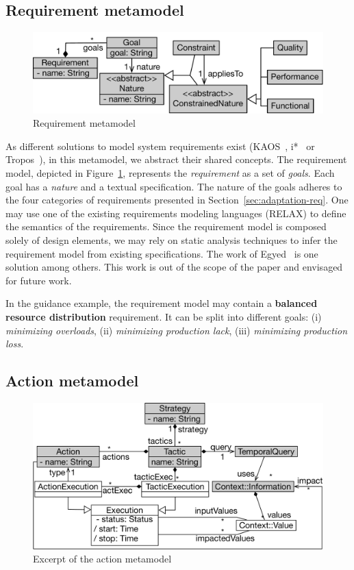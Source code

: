 \subsection{Requirement metamodel}

\begin{figure}
	\centering
	\includegraphics[width=0.7\linewidth]{img/chapt-tkm/mm/requirementModel}
	\caption{Requirement metamodel}
	\label{fig:requirement-model}
\end{figure}

As different solutions to model system requirements exist (\eg KAOS~\cite{DBLP:journals/scp/DardenneLF93}, i*~\cite{yu2011modelling} or Tropos~\cite{DBLP:journals/aamas/BrescianiPGGM04}), in this metamodel, we abstract their shared concepts.
The requirement model, depicted in Figure~\ref{fig:requirement-model}, represents the \textit{requirement} as a set of \textit{goals}.
Each goal has a \textit{nature} and a textual specification.
The nature of the goals adheres to the four categories of requirements presented in Section~\ref{sec:adaptation-req}.
One may use one of the existing requirements modeling languages (\eg RELAX) to define the semantics of the requirements. 
Since the requirement model is composed solely of design elements, we may rely on static analysis techniques to infer the requirement model from existing specifications.
The work of Egyed~\cite{DBLP:conf/icse/Egyed01} is one solution among others.
This work is out of the scope of the paper and envisaged for future work. 

In the guidance example, the requirement model may contain a \textbf{balanced resource distribution} requirement.
It can be split into different goals: (i) \textit{minimizing overloads}, (ii) \textit{minimizing production lack}, (iii) \textit{minimizing production loss}.

\subsection{Action metamodel}
\label{sec:action-mm}

\begin{figure}
	\centering
	\includegraphics[width=0.8\linewidth]{img/chapt-tkm/mm/actionModel}
	\caption{Excerpt of the action metamodel}
	\label{fig:action-mm}
\end{figure}

